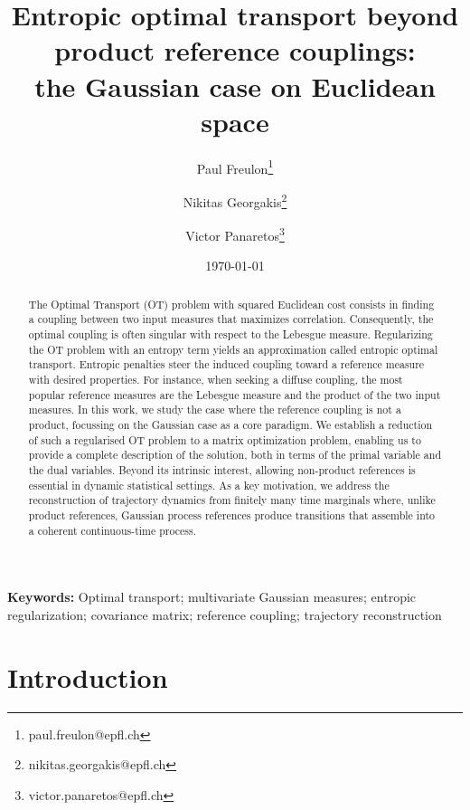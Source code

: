 \documentclass[]{article}
\title{Entropic optimal transport beyond product reference couplings:\\
the Gaussian case on Euclidean space}
\author[1]{Paul Freulon\footnote{paul.freulon@epfl.ch}}
\author[1]{Nikitas Georgakis\footnote{nikitas.georgakis@epfl.ch}}
\author[1]{Victor Panaretos\footnote{victor.panaretos@epfl.ch} }
\affil[1]{Ecole Polytechnique Fédérale de Lausanne, Institute of Mathematics,  CH-1015 Lausanne, Switzerland.}
\date{\today}
\numberwithin{equation}{section}
\theoremstyle{plain}
\begin{document}
	\maketitle
	
	\begin{abstract}
		The Optimal Transport (OT) problem with squared Euclidean cost consists in finding a coupling between two input measures that maximizes correlation. Consequently, the optimal coupling is often singular with respect to the Lebesgue measure. Regularizing the OT problem with an entropy term yields an approximation called entropic optimal transport. Entropic penalties steer the induced coupling toward a reference measure with desired properties. For instance, when seeking a diffuse coupling, the most popular reference measures are the Lebesgue measure and the product of the two input measures. In this work, we study the case where the reference coupling is not a product, focussing on the Gaussian case as a core paradigm. We establish a reduction of such a regularised OT problem to a matrix optimization problem, enabling us to provide a complete description of the solution, both in terms of the primal variable and the dual variables. Beyond its intrinsic interest, allowing non-product references is essential in dynamic statistical settings. As a key motivation, we address the reconstruction of trajectory dynamics from finitely many time marginals where, unlike product references, Gaussian process references produce transitions that assemble into a coherent continuous-time process.
        

 
	\end{abstract}
		
	\textbf{Keywords:} Optimal transport; multivariate Gaussian measures; entropic regularization; covariance matrix; reference coupling; trajectory reconstruction%

\tableofcontents

\section{Introduction}
\end{document}
